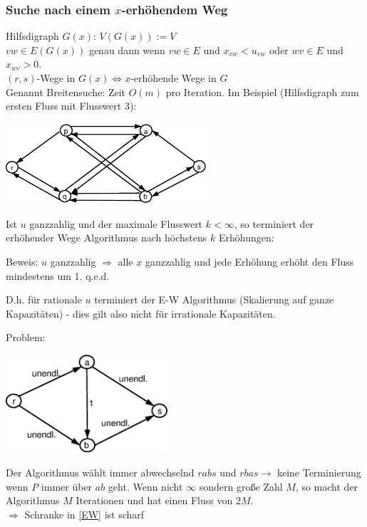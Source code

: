 \subsubsection{Suche nach einem $x$-erhöhendem Weg}
Hilfsdigraph $G(x)$: $V(G(x)) := V$\\
$v w \in E(G(x))$ genau dann wenn $v w \in E$ und $x_{v w} < u_{v w}$ oder $w v 
\in E$ und $x_{w v} > 0$.\\
$(r,s)$-Wege in $G(x) \Leftrightarrow x$-erhöhende Wege in $G$\\
Genannt Breitensuche: Zeit $O(m)$ pro Iteration. Im Beispiel 
(Hilfsdigraph zum ersten Fluss mit Flusswert 3):


\includegraphics[height=3cm]{bilder/3-0MaxflussDig}

\begin{satz} \label{EW}
Ist $u$ ganzzahlig und der maximale Flusswert $k < \infty$, so terminiert
der erhöhender Wege Algorithmus nach höchstens $k$ Erhöhungen:
\end{satz}
Beweis: $u$ ganzzahlig $\Rightarrow$ alle $x$ ganzzahlig und jede Erhöhung
erhöht den Fluss mindestens um 1. q.e.d.

D.h. für rationale $u$ terminiert der E-W Algorithmus (Skalierung auf ganze
Kapazitäten) - dies gilt also nicht für irrationale Kapazitäten.

Problem:

\includegraphics[width=6cm]{bilder/3-0EWTermnicht}

Der Algorithmus wählt immer abwechselnd $r a b s$ und $r b a s \rightarrow$
keine Terminierung wenn $P$ immer über $a b$ geht. Wenn nicht $\infty$
sondern große Zahl $M$, so macht der Algorithmus $M$ Iterationen und hat
einen Fluss von $2M$.\\
$\Rightarrow$ Schranke in \ref{EW} ist scharf

